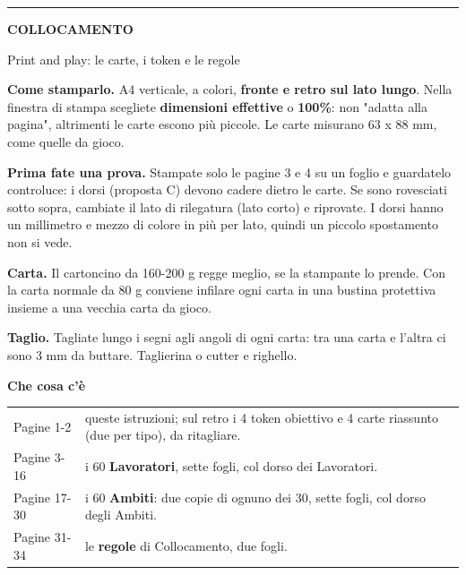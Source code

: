 \documentclass[10pt]{article}
\begin{document}
\color{petrolio}

\vspace*{16mm}\hspace*{18mm}\begin{minipage}[t]{174mm}\fontsize{10.5}{14.2}\selectfont\setlength{\parskip}{2.4mm}
{\color{rosa}\rule{14mm}{2.8pt}}\par\vspace{1mm}
{\fontsize{24}{27}\selectfont\bfseries COLLOCAMENTO\par}
{\fontsize{12}{15}\selectfont Print and play: le carte, i token e le regole\par}
\vspace{5mm}
\textbf{Come stamparlo.} A4 verticale, a colori, \textbf{fronte e retro sul lato lungo}. Nella finestra di stampa scegliete \textbf{dimensioni effettive} o \textbf{100\%}: non "adatta alla pagina", altrimenti le carte escono più piccole. Le carte misurano 63 x 88 mm, come quelle da gioco.

\textbf{Prima fate una prova.} Stampate solo le pagine 3 e 4 su un foglio e guardatelo controluce: i dorsi (proposta C) devono cadere dietro le carte. Se sono rovesciati sotto sopra, cambiate il lato di rilegatura (lato corto) e riprovate. I dorsi hanno un millimetro e mezzo di colore in più per lato, quindi un piccolo spostamento non si vede.

\textbf{Carta.} Il cartoncino da 160-200 g regge meglio, se la stampante lo prende. Con la carta normale da 80 g conviene infilare ogni carta in una bustina protettiva insieme a una vecchia carta da gioco.

\textbf{Taglio.} Tagliate lungo i segni agli angoli di ogni carta: tra una carta e l'altra ci sono 3 mm da buttare. Taglierina o cutter e righello.

\vspace{2mm}
{\fontsize{13}{16}\selectfont\bfseries Che cosa c'è\par}
\vspace{1mm}
\begin{tabular}{@{}p{30mm}p{140mm}@{}}
Pagine 1-2 & queste istruzioni; sul retro i 4 token obiettivo e 4 carte riassunto (due per tipo), da ritagliare. \\[1mm]
Pagine 3-16 & i 60 \textbf{Lavoratori}, sette fogli, col dorso dei Lavoratori. \\[1mm]
Pagine 17-30 & i 60 \textbf{Ambiti}: due copie di ognuno dei 30, sette fogli, col dorso degli Ambiti. \\[1mm]
Pagine 31-34 & le \textbf{regole} di Collocamento, due fogli. \\
\end{tabular}


\end{minipage}
\end{document}
